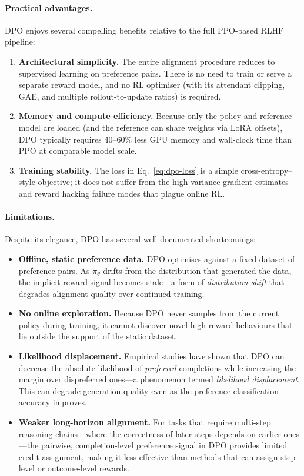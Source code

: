 \paragraph{Practical advantages.}
DPO enjoys several compelling benefits relative to the full PPO-based RLHF
pipeline:
\begin{enumerate}[leftmargin=1.8em,itemsep=2pt]
\item \textbf{Architectural simplicity.}  The entire alignment procedure
      reduces to supervised learning on preference pairs.  There is no need to
      train or serve a separate reward model, and no RL optimiser (with its
      attendant clipping, GAE, and multiple rollout-to-update ratios) is
      required.
\item \textbf{Memory and compute efficiency.}  Because only the policy and
      reference model are loaded (and the reference can share weights via
      LoRA offsets), DPO typically requires 40--60\% less GPU memory and
      wall-clock time than PPO at comparable model scale.
\item \textbf{Training stability.}  The loss in Eq.~\eqref{eq:dpo-loss} is a
      simple cross-entropy--style objective; it does not suffer from the
      high-variance gradient estimates and reward hacking failure modes that
      plague online RL.
\end{enumerate}

\paragraph{Limitations.}
Despite its elegance, DPO has several well-documented shortcomings:
\begin{itemize}[leftmargin=1.8em,itemsep=2pt]
\item \textbf{Offline, static preference data.}  DPO optimises against a fixed
      dataset of preference pairs.  As $\pi_{\theta}$ drifts from the
      distribution that generated the data, the implicit reward signal becomes
      stale---a form of \emph{distribution shift} that degrades alignment
      quality over continued training.
\item \textbf{No online exploration.}  Because DPO never samples from the
      current policy during training, it cannot discover novel high-reward
      behaviours that lie outside the support of the static dataset.
\item \textbf{Likelihood displacement.}  Empirical studies have shown that DPO
      can decrease the absolute likelihood of \emph{preferred} completions
      while increasing the margin over dispreferred ones---a phenomenon termed
      \emph{likelihood displacement}.  This can degrade generation quality even
      as the preference-classification accuracy improves.
\item \textbf{Weaker long-horizon alignment.}  For tasks that require
      multi-step reasoning chains---where the correctness of later steps
      depends on earlier ones---the pairwise, completion-level preference
      signal in DPO provides limited credit assignment, making it less
      effective than methods that can assign step-level or
      outcome-level rewards.
\end{itemize}

